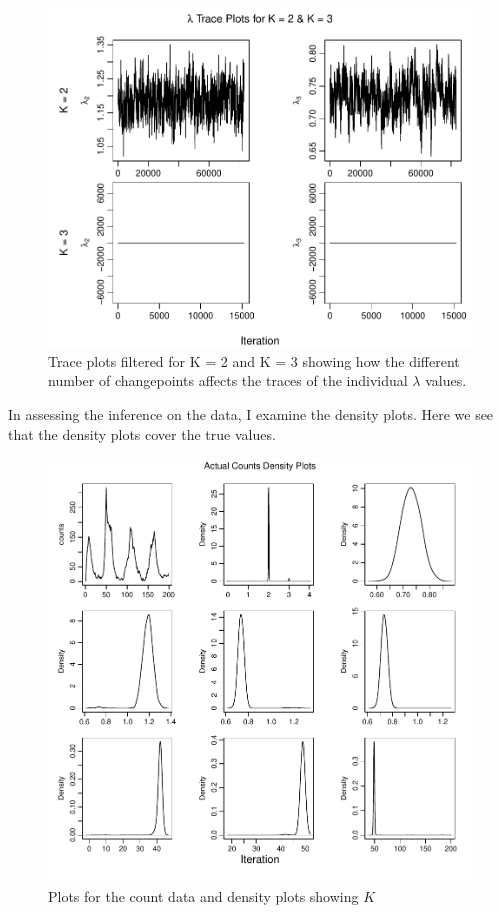 \documentclass[11pt,a4paper]{article}
\numberwithin{equation}{section}
\begin{document}
\begin{figure}

{\centering \includegraphics[height=0.41\textheight]{thesis_draft_files/figure-latex/unnamed-chunk-5-1} 

}

\caption{Trace plots filtered for K = 2 and K = 3 showing how the different number of changepoints affects the traces of the individual $\lambda$ values.}\label{fig:unnamed-chunk-5}
\end{figure}

In assessing the inference on the data, I examine the density plots.
Here we see that the density plots cover the true values.

\begin{figure}
\centering
\includegraphics{thesis_draft_files/figure-latex/unnamed-chunk-6-1.pdf}
\caption{\label{fig:2c_dens} Plots for the count data and density plots
showing \(K\)}
\end{figure}
\end{document}

